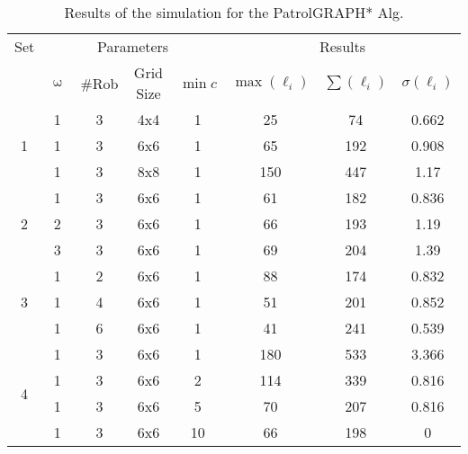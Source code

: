 \begin{table}[H]
\centering
\begin{tabular}{@{}cccccccc@{}}
\toprule
Set                & \multicolumn{4}{c}{Parameters}  & \multicolumn{3}{c}{Results}              \\ \cmidrule(lr){2-5} \cmidrule(lr){6-8}
                   & $\upomega$ & \#Rob & Grid Size & $\min c$ & $\max(\ell_i)$ & $\sum(\ell_i)$ & $\sigma(\ell_i)$ \\ \midrule
\multirow{3}{*}{1} & 1           & 3     & 4x4       &   1     &  25       &  74       &   0.662   \\
                             & 1           & 3     & 6x6       &   1     &   65      &  192      &   0.908    \\
                             & 1           & 3     & 8x8       &   1     &   150     &  447     &   1.17    \\ \midrule
\multirow{3}{*}{2} & 1           & 3     & 6x6       &   1     &   61      &  182      &  0.836     \\
                             & 2           & 3     & 6x6       &   1     &   66      &  193      &  1.19     \\
                             & 3           & 3     & 6x6       &   1     &   69      &  204      &  1.39     \\ \midrule
\multirow{3}{*}{3} & 1           & 2     & 6x6       &   1     &  88       &  174      &  0.832        \\
                             & 1           & 4     & 6x6       &   1     &  51       &  201      &  0.852        \\
                             & 1           & 6     & 6x6       &   1     &  41       & 241       &  0.539           \\ \midrule
\multirow{4}{*}{4} & 1           & 3     & 6x6       &   1     &  180     &   533     &    3.366        \\
                             & 1           & 3     & 6x6       &   2     &  114     &  339      &   0.816        \\
                             & 1           & 3     & 6x6       &   5     &  70      &   207      &   0.816       \\
                             & 1           & 3     & 6x6       &   10   &  66      &    198     &  0        \\ \bottomrule
\end{tabular}
\caption{Results of the simulation for the PatrolGRAPH* Alg.}
\label{tab:PG_results}
\end{table}

